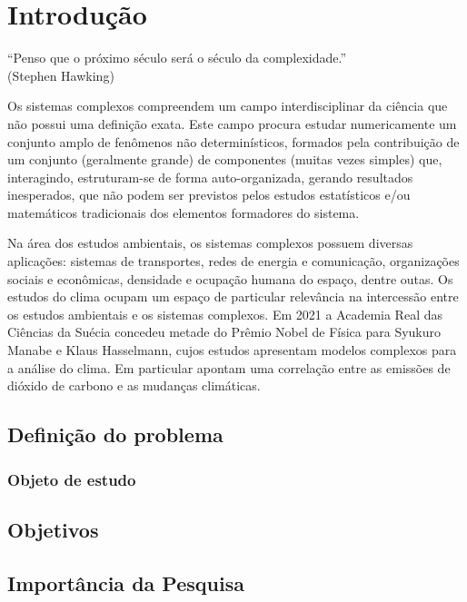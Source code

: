 \chapter{Introdução}
\label{cap:introducao}


\begin{flushright}
``Penso que o próximo século será o século da complexidade.''\\
(Stephen Hawking)
\end{flushright}

Os sistemas complexos compreendem um campo interdisciplinar da ciência que não possui uma definição exata. Este campo procura estudar numericamente um conjunto amplo de fenômenos não determinísticos, formados pela contribuição de um conjunto (geralmente grande) de componentes (muitas vezes simples) que, interagindo, estruturam-se de forma auto-organizada, gerando resultados inesperados, que não podem ser previstos pelos estudos estatísticos e/ou matemáticos tradicionais dos elementos formadores do sistema.

Na área dos estudos ambientais, os sistemas complexos possuem diversas aplicações: sistemas de transportes, redes de energia e comunicação, organizações sociais e econômicas, densidade e ocupação humana do espaço, dentre outas. Os estudos do clima ocupam um espaço de particular relevância na intercessão entre os estudos ambientais e os sistemas complexos. Em 2021 a Academia Real das Ciências da Suécia concedeu metade do Prêmio Nobel de Física para Syukuro Manabe e Klaus Hasselmann, cujos estudos apresentam modelos complexos para a análise do clima. Em particular apontam uma correlação entre as emissões de dióxido de carbono e as mudanças climáticas.



\section{Definição do problema}
\label{sec:problema}


\subsection{Objeto de estudo}
\label{ssec:Objeto de estudo}


\section{Objetivos}
\label{sec:objetivo}


\section{Importância da Pesquisa}
\label{sec:justificativa}



